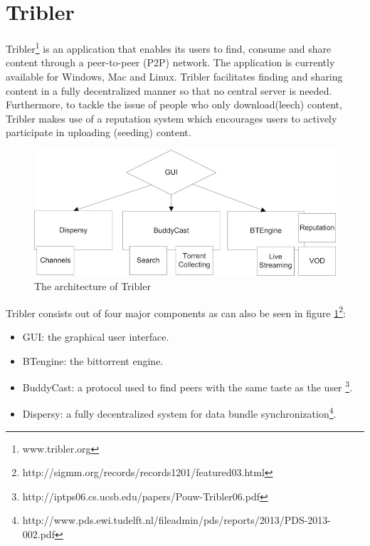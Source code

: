\section{Tribler}

Tribler\footnote{www.tribler.org} is an application that enables its users to find, consume and share content through a peer-to-peer (P2P) network. The application is currently available for Windows, Mac and Linux. Tribler facilitates finding and sharing content in a fully decentralized manner so that no central server is needed. Furthermore, to tackle the issue of people who only download(leech) content, Tribler makes use of a reputation system which encourages users to actively participate in uploading (seeding) content.

\begin{figure}[h]
	\centering
	\includegraphics[scale=0.4]{tribler/images/tribler_component_overview.jpg}
	\caption{The architecture of Tribler}
	\label{fig:tribler_components}
\end{figure}

Tribler consists out of four major components as can also be seen in figure \ref{fig:tribler_components}\footnote {http://sigmm.org/records/records1201/featured03.html}:
\begin{itemize}
	\item GUI: the graphical user interface.
	\item BTengine: the bittorrent engine.
	\item BuddyCast: a protocol used to find peers with the same taste as the user \footnote{http://iptps06.cs.ucsb.edu/papers/Pouw-Tribler06.pdf}.
	\item Dispersy: a fully decentralized system for data bundle synchronization\footnote{http://www.pds.ewi.tudelft.nl/fileadmin/pds/reports/2013/PDS-2013-002.pdf}.
\end{itemize}

